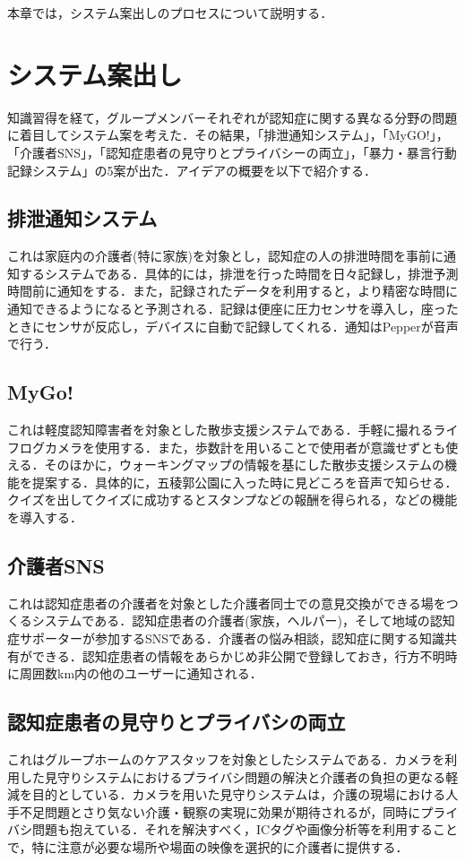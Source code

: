 \documentclass[../report]{subfiles}
\begin{document}
本章では，システム案出しのプロセスについて説明する．

\section{システム案出し}
知識習得を経て，グループメンバーそれぞれが認知症に関する異なる分野の問題に着目してシステム案を考えた．その結果，「排泄通知システム」，「MyGO!」，「介護者SNS」，「認知症患者の見守りとプライバシーの両立」，「暴力・暴言行動記録システム」の5案が出た．アイデアの概要を以下で紹介する．

\subsection{排泄通知システム}
これは家庭内の介護者(特に家族)を対象とし，認知症の人の排泄時間を事前に通知するシステムである．具体的には，排泄を行った時間を日々記録し，排泄予測時間前に通知をする．また，記録されたデータを利用すると，より精密な時間に通知できるようになると予測される．記録は便座に圧力センサを導入し，座ったときにセンサが反応し，デバイスに自動で記録してくれる．通知はPepperが音声で行う．

\subsection{MyGo!}
これは軽度認知障害者を対象とした散歩支援システムである．手軽に撮れるライフログカメラを使用する．また，歩数計を用いることで使用者が意識せずとも使える．そのほかに，ウォーキングマップの情報を基にした散歩支援システムの機能を提案する．具体的に，五稜郭公園に入った時に見どころを音声で知らせる．クイズを出してクイズに成功するとスタンプなどの報酬を得られる，などの機能を導入する．

\subsection{介護者SNS}
これは認知症患者の介護者を対象とした介護者同士での意見交換ができる場をつくるシステムである．認知症患者の介護者(家族，ヘルパー)，そして地域の認知症サポーターが参加するSNSである．介護者の悩み相談，認知症に関する知識共有ができる．認知症患者の情報をあらかじめ非公開で登録しておき，行方不明時に周囲数km内の他のユーザーに通知される．

\subsection{認知症患者の見守りとプライバシの両立}
これはグループホームのケアスタッフを対象としたシステムである．カメラを利用した見守りシステムにおけるプライバシ問題の解決と介護者の負担の更なる軽減を目的としている．カメラを用いた見守りシステムは，介護の現場における人手不足問題とさり気ない介護・観察の実現に効果が期待されるが，同時にプライバシ問題も抱えている．それを解決すべく，ICタグや画像分析等を利用することで，特に注意が必要な場所や場面の映像を選択的に介護者に提供する．
\end{document}
